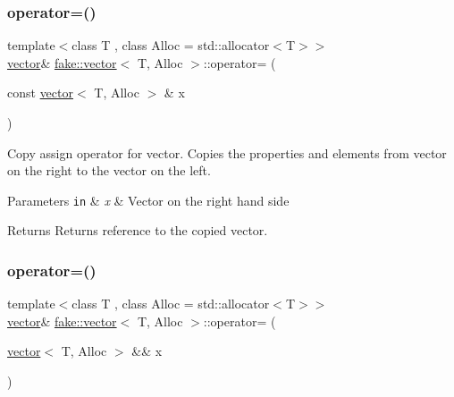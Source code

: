 \subsubsection{\texorpdfstring{operator=()}{operator=()}\hspace{0.1cm}{\footnotesize\ttfamily [1/3]}}
{\footnotesize\ttfamily template$<$class T , class Alloc  = std\+::allocator$<$\+T$>$$>$ \\
\mbox{\hyperlink{classfake_1_1vector}{vector}}\& \mbox{\hyperlink{classfake_1_1vector}{fake\+::vector}}$<$ T, Alloc $>$\+::operator= (\begin{DoxyParamCaption}\item[{const \mbox{\hyperlink{classfake_1_1vector}{vector}}$<$ T, Alloc $>$ \&}]{x }\end{DoxyParamCaption})\hspace{0.3cm}{\ttfamily [inline]}}



Copy assign operator for vector. Copies the properties and elements from vector on the right to the vector on the left. 


\begin{DoxyParams}[1]{Parameters}
\mbox{\tt in}  & {\em x} & Vector on the right hand side\\
\hline
\end{DoxyParams}
\begin{DoxyReturn}{Returns}
Returns reference to the copied vector. 
\end{DoxyReturn}
\mbox{\label{classfake_1_1vector_a3f7710f0e21f7531d24908bc82548f2b}} 
\subsubsection{\texorpdfstring{operator=()}{operator=()}\hspace{0.1cm}{\footnotesize\ttfamily [2/3]}}
{\footnotesize\ttfamily template$<$class T , class Alloc  = std\+::allocator$<$\+T$>$$>$ \\
\mbox{\hyperlink{classfake_1_1vector}{vector}}\& \mbox{\hyperlink{classfake_1_1vector}{fake\+::vector}}$<$ T, Alloc $>$\+::operator= (\begin{DoxyParamCaption}\item[{\mbox{\hyperlink{classfake_1_1vector}{vector}}$<$ T, Alloc $>$ \&\&}]{x }\end{DoxyParamCaption})\hspace{0.3cm}{\ttfamily [inline]}}



